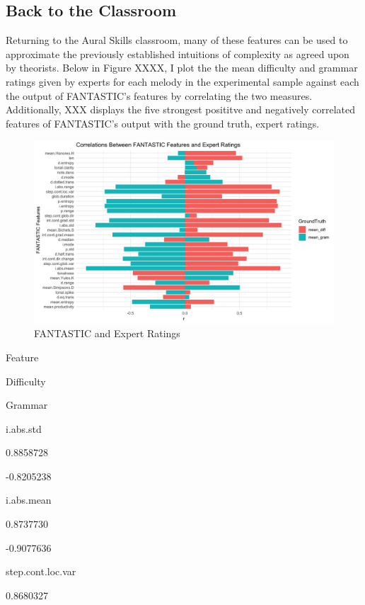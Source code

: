 \documentclass[]{book}
\begin{document}
\hypertarget{back-to-the-classroom}{%
\subsection{Back to the Classroom}\label{back-to-the-classroom}}

Returning to the Aural Skills classroom, many of these features can be used to approximate the previously established intuitions of complexity as agreed upon by theorists.
Below in Figure XXXX, I plot the the mean difficulty and grammar ratings given by experts for each melody in the experimental sample against each the output of FANTASTIC's features by correlating the two measures.
Additionally, XXX displays the five strongest posititve and negatively correlated features of FANTASTIC's output with the ground truth, expert ratings.

\begin{figure}

{\centering \includegraphics[width=1\linewidth]{img/FantasticExpertPlot} 

}

\caption{FANTASTIC and Expert Ratings}\label{fig:corfeature}
\end{figure}

Feature

Difficulty

Grammar

i.abs.std

0.8858728

-0.8205238

i.abs.mean

0.8737730

-0.9077636

step.cont.loc.var

0.8680327
\end{document}
